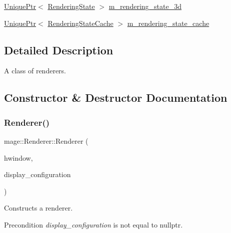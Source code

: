 \begin{DoxyCompactItemize}
\item 
\hyperlink{namespacemage_a3316d7143a973e37adf1110f2e80ca31}{Unique\+Ptr}$<$ \hyperlink{structmage_1_1_rendering_state}{Rendering\+State} $>$ \hyperlink{classmage_1_1_renderer_adf94d97911e24a3f712b294967666014}{m\+\_\+rendering\+\_\+state\+\_\+3d}
\item 
\hyperlink{namespacemage_a3316d7143a973e37adf1110f2e80ca31}{Unique\+Ptr}$<$ \hyperlink{structmage_1_1_rendering_state_cache}{Rendering\+State\+Cache} $>$ \hyperlink{classmage_1_1_renderer_a3d9f823ecef314a974c4cdb3a71a1853}{m\+\_\+rendering\+\_\+state\+\_\+cache}
\end{DoxyCompactItemize}


\subsection{Detailed Description}
A class of renderers. 

\subsection{Constructor \& Destructor Documentation}
\hypertarget{classmage_1_1_renderer_a63948f43587e63f5caafa2260e9dfc52}{}\label{classmage_1_1_renderer_a63948f43587e63f5caafa2260e9dfc52} 
\subsubsection{\texorpdfstring{Renderer()}{Renderer()}\hspace{0.1cm}{\footnotesize\ttfamily [1/3]}}
{\footnotesize\ttfamily mage\+::\+Renderer\+::\+Renderer (\begin{DoxyParamCaption}\item[{H\+W\+ND}]{hwindow,  }\item[{const \hyperlink{structmage_1_1_display_configuration}{Display\+Configuration} $\ast$}]{display\+\_\+configuration }\end{DoxyParamCaption})\hspace{0.3cm}{\ttfamily [explicit]}}

Constructs a renderer.

\begin{DoxyPrecond}{Precondition}
{\itshape display\+\_\+configuration} is not equal to {\ttfamily nullptr}. 
\end{DoxyPrecond}

